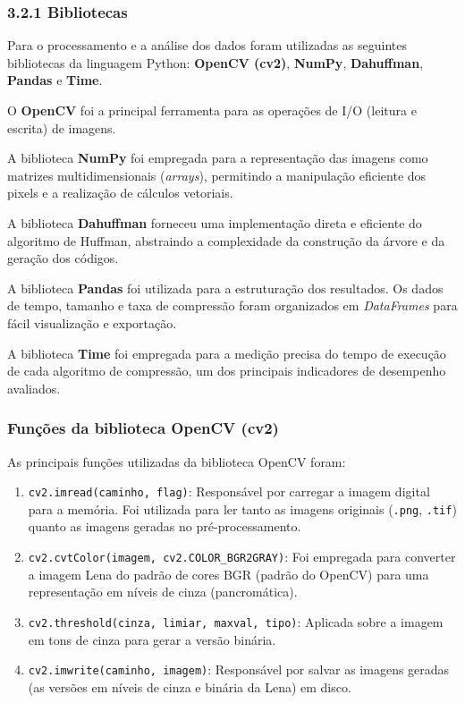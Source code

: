 \documentclass{report}
\begin{document}
\subsubsection*{3.2.1 Bibliotecas}

Para o processamento e a análise dos dados foram utilizadas as seguintes bibliotecas da linguagem Python: \textbf{OpenCV (cv2)}, \textbf{NumPy}, \textbf{Dahuffman}, \textbf{Pandas} e \textbf{Time}.

O \textbf{OpenCV} foi a principal ferramenta para as operações de I/O (leitura e escrita) de imagens.

A biblioteca \textbf{NumPy} foi empregada para a representação das imagens como matrizes multidimensionais (\textit{arrays}), permitindo a manipulação eficiente dos pixels e a realização de cálculos vetoriais.

A biblioteca \textbf{Dahuffman} forneceu uma implementação direta e eficiente do algoritmo de Huffman, abstraindo a complexidade da construção da árvore e da geração dos códigos.

A biblioteca \textbf{Pandas} foi utilizada para a estruturação dos resultados. Os dados de tempo, tamanho e taxa de compressão foram organizados em \textit{DataFrames} para fácil visualização e exportação.

A biblioteca \textbf{Time} foi empregada para a medição precisa do tempo de execução de cada algoritmo de compressão, um dos principais indicadores de desempenho avaliados.


\subsubsection{Funções da biblioteca OpenCV (cv2)}
\label{sssec:funcoes_cv2}

As principais funções utilizadas da biblioteca OpenCV foram:

\begin{enumerate}
    \item \texttt{cv2.imread(caminho, flag)}: Responsável por carregar a imagem digital para a memória. Foi utilizada para ler tanto as imagens originais (\texttt{.png}, \texttt{.tif}) quanto as imagens geradas no pré-processamento.
    
    \item \texttt{cv2.cvtColor(imagem, cv2.COLOR\_BGR2GRAY)}: Foi empregada para converter a imagem Lena do padrão de cores BGR (padrão do OpenCV) para uma representação em níveis de cinza (pancromática).
    
    \item \texttt{cv2.threshold(cinza, limiar, maxval, tipo)}: Aplicada sobre a imagem em tons de cinza para gerar a versão binária.
    
    \item \texttt{cv2.imwrite(caminho, imagem)}: Responsável por salvar as imagens geradas (as versões em níveis de cinza e binária da Lena) em disco.
\end{enumerate}
\end{document}
